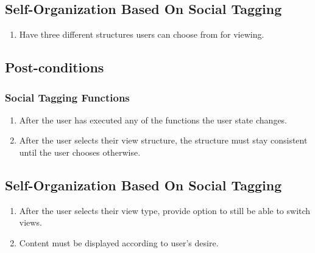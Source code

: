 \documentclass[12pt, oneside]{article}
\begin{document}
\subsection{Self-Organization Based On Social Tagging}
\begin{enumerate}
\item Have three different structures users can choose from for viewing.
\end{enumerate}
\subsection{Post-conditions}
\subsubsection{Social Tagging Functions}    
\begin{enumerate}
\item After the user has executed any of the functions the user state changes.
\item After the user selects their view structure, the structure must stay consistent until the user chooses otherwise.
\end{enumerate}
\subsection{Self-Organization Based On Social Tagging}
\begin{enumerate}
\item After the user selects their view type, provide option to still be able to switch views.
\item Content must be displayed according to user's desire.
\end{enumerate}
\end{document}
